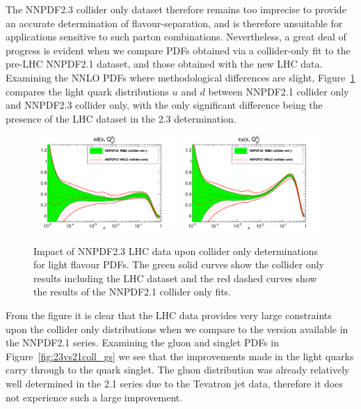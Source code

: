 The NNPDF2.3 collider only dataset therefore remains too imprecise to provide an accurate determination of flavour-separation, and is therefore unsuitable for applications sensitive to such parton combinations. Nevertheless, a great deal of progress is evident when we compare PDFs obtained via a collider-only fit to the pre-LHC NNPDF2.1 dataset, and those obtained with the new LHC data. Examining the NNLO PDFs where methodological differences are slight, Figure~\ref{fig:23vs21coll_lqs} compares the light quark distributions $u$ and $d$ between NNPDF2.1 collider only and NNPDF2.3 collider only, with the only significant difference being the presence of the LHC dataset in the 2.3 determination.

\begin{figure}[h]
\centering
\includegraphics[width=0.48\textwidth]{6-LHCimpact/figs/pdf_xd_log_band_comparison.pdf}
\includegraphics[width=0.48\textwidth]{6-LHCimpact/figs/pdf_xu_log_band_comparison.pdf}
\caption[Impact of NNPDF2.3 LHC data upon collider only determinations for light flavour PDFs]{Impact of NNPDF2.3 LHC data upon collider only determinations for light flavour PDFs. The green solid curves show the collider only results including the LHC dataset and the red dashed curves show the results of the NNPDF2.1 collider only fits.}
\label{fig:23vs21coll_lqs}
\end{figure}
\clearpage
From the figure it is clear that the LHC data provides very large constraints upon the collider only distributions when we compare to the version available in the NNPDF2.1 series. Examining the gluon and singlet PDFs in Figure~\ref{fig:23vs21coll_gs} we see that the improvements made in the light quarks carry through to the quark singlet. The gluon distribution was already relatively well determined in the 2.1 series due to the Tevatron jet data, therefore it does not experience such a large improvement. 

